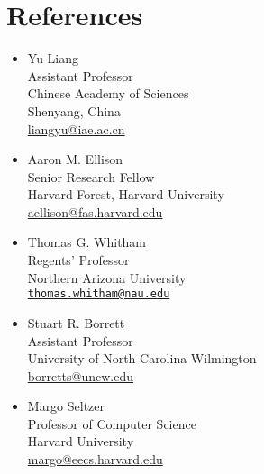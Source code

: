 \documentclass[a4paper]{article}
\begin{document}
\section{References}\label{references}

\begin{multicols}{2}

\begin{itemize}
\item 
  Yu Liang\\ Assistant Professor\\ Chinese Academy of Sciences
  \\ Shenyang, China \\\href{mailto:liangyu@iae.ac.cn}{liangyu@iae.ac.cn}
\item
  Aaron M. Ellison\\ Senior Research Fellow\\ Harvard Forest, Harvard
  University\\ \href{mailto:aellison@fas.harvard.edu}{aellison@fas.harvard.edu}
\item
  Thomas G. Whitham\\ Regents' Professor\\ Northern Arizona
  University\\ \href{mailto:thomas.whitham@nau.edu}{\texttt{thomas.whitham@nau.edu}}
\end{itemize}

\begin{itemize}
\item
  Stuart R. Borrett\\ Assistant Professor\\ University of North Carolina
  Wilmington\\ \href{mailto:borretts@uncw.edu}{borretts@uncw.edu}
\item
  Margo Seltzer\\ Professor of Computer Science\\ Harvard
  University\\ \href{mailto:margo@eecs.harvard.edu}{margo@eecs.harvard.edu}
\end{itemize}

\end{multicols}
\end{document}
